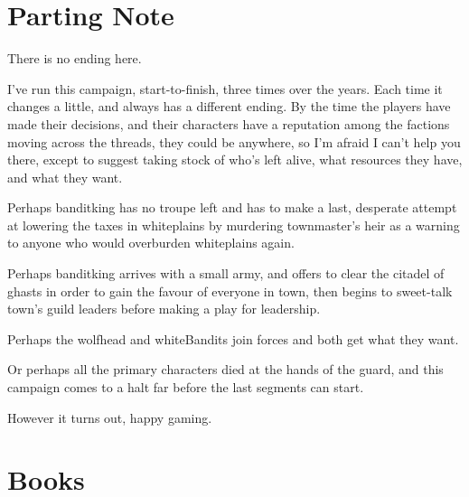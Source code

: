 \section*{Parting Note}
\label{noEnding}

There is no ending here.

I've run this campaign, start-to-finish, three times over the years.
Each time it changes a little, and always has a different ending.
By the time the players have made their decisions, and their characters have a reputation among the factions moving across the \glspl{thread}, they could be anywhere, so I'm afraid I can't help you there, except to suggest taking stock of who's left alive, what resources they have, and what they want.

Perhaps \gls{banditking} has no troupe left and has to make a last, desperate attempt at lowering the taxes in \gls{whiteplains} by murdering \gls{townmaster}'s heir as a warning to anyone who would overburden \gls{whiteplains} again.

Perhaps \gls{banditking} arrives with a small army, and offers to clear the citadel of \glspl{ghast} in order to gain the favour of everyone in \gls{town}, then begins to sweet-talk \gls{town}'s guild leaders before making a play for leadership.

Perhaps the \gls{wolfhead} and \gls{whiteBandits} join forces and both get what they want.

Or perhaps all the primary characters died at the hands of the \gls{guard}, and this campaign comes to a halt far before the last \glspl{segment} can start.

However it turns out, happy gaming.

\section{Books}
\label{bookAppendix}

